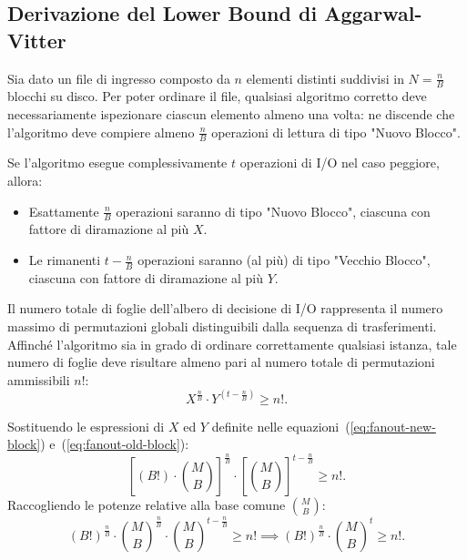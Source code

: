 \FloatBarrier
\subsection{Derivazione del Lower Bound di Aggarwal-Vitter}
\label{subsec:formal-derivation-av}

Sia dato un file di ingresso composto da $n$ elementi distinti suddivisi in $N = \frac{n}{B}$ blocchi su disco. Per poter ordinare il file, qualsiasi algoritmo corretto deve necessariamente ispezionare ciascun elemento almeno una volta: ne discende che l'algoritmo deve compiere almeno $\frac{n}{B}$ operazioni di lettura di tipo "Nuovo Blocco".

Se l'algoritmo esegue complessivamente $t$ operazioni di I/O nel caso peggiore, allora:
\begin{itemize}
  \item Esattamente $\frac{n}{B}$ operazioni saranno di tipo "Nuovo Blocco", ciascuna con fattore di diramazione al più $X$.
  \item Le rimanenti $t - \frac{n}{B}$ operazioni saranno (al più) di tipo "Vecchio Blocco", ciascuna con fattore di diramazione al più $Y$.
\end{itemize}

Il numero totale di foglie dell'albero di decisione di I/O rappresenta il numero massimo di permutazioni globali distinguibili dalla sequenza di trasferimenti. Affinché l'algoritmo sia in grado di ordinare correttamente qualsiasi istanza, tale numero di foglie deve risultare almeno pari al numero totale di permutazioni ammissibili $n!$:
\begin{equation}
  X^{\frac{n}{B}} \cdot Y^{\left(t - \frac{n}{B}\right)} \ge n!.
  \label{eq:io-tree-leaves-inequality}
\end{equation}

Sostituendo le espressioni di $X$ ed $Y$ definite nelle equazioni~(\ref{eq:fanout-new-block}) e~(\ref{eq:fanout-old-block}):
\begin{equation}
  \left[ (B!) \cdot \binom{M}{B} \right]^{\frac{n}{B}} \cdot \left[ \binom{M}{B} \right]^{t - \frac{n}{B}} \ge n!.
\end{equation}
Raccogliendo le potenze relative alla base comune $\binom{M}{B}$:
\begin{equation}
  (B!)^{\frac{n}{B}} \cdot \binom{M}{B}^{\frac{n}{B}} \cdot \binom{M}{B}^{t - \frac{n}{B}} \ge n! \implies (B!)^{\frac{n}{B}} \cdot \binom{M}{B}^t \ge n!.
  \label{eq:leaves-compact-inequality}
\end{equation}

